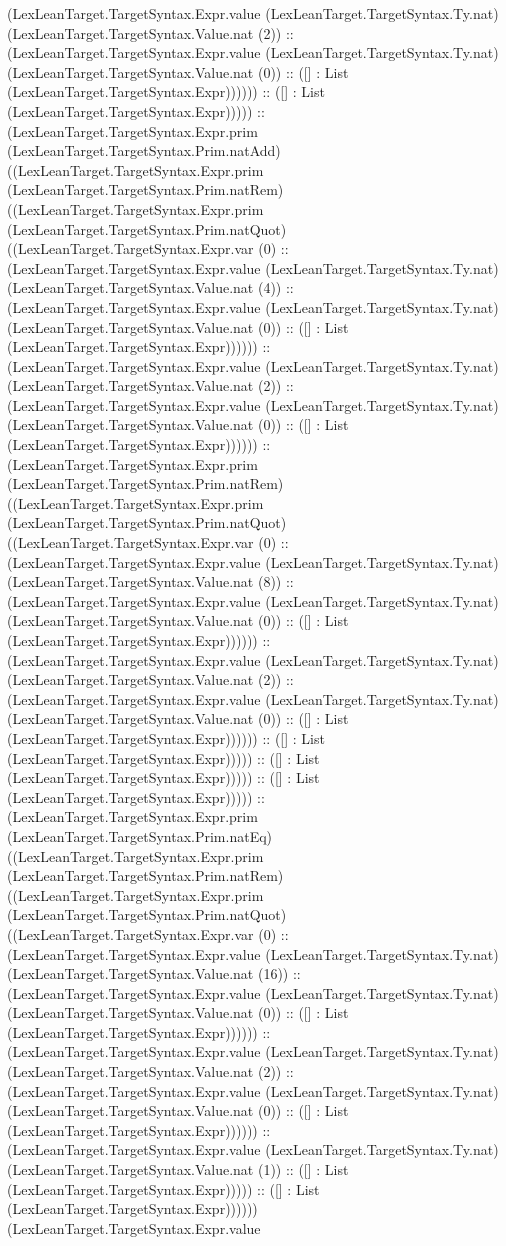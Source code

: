\documentclass[11pt]{article}
\begin{document}
(LexLeanTarget.TargetSyntax.Expr.value (LexLeanTarget.TargetSyntax.Ty.nat) (LexLeanTarget.TargetSyntax.Value.nat (2)) :: (LexLeanTarget.TargetSyntax.Expr.value (LexLeanTarget.TargetSyntax.Ty.nat) (LexLeanTarget.TargetSyntax.Value.nat (0)) :: ([] : List (LexLeanTarget.TargetSyntax.Expr)))))) :: ([] : List (LexLeanTarget.TargetSyntax.Expr))))) :: (LexLeanTarget.TargetSyntax.Expr.prim (LexLeanTarget.TargetSyntax.Prim.natAdd) ((LexLeanTarget.TargetSyntax.Expr.prim (LexLeanTarget.TargetSyntax.Prim.natRem) ((LexLeanTarget.TargetSyntax.Expr.prim (LexLeanTarget.TargetSyntax.Prim.natQuot) ((LexLeanTarget.TargetSyntax.Expr.var (0) :: (LexLeanTarget.TargetSyntax.Expr.value (LexLeanTarget.TargetSyntax.Ty.nat) (LexLeanTarget.TargetSyntax.Value.nat (4)) :: (LexLeanTarget.TargetSyntax.Expr.value (LexLeanTarget.TargetSyntax.Ty.nat) (LexLeanTarget.TargetSyntax.Value.nat (0)) :: ([] : List (LexLeanTarget.TargetSyntax.Expr)))))) :: (LexLeanTarget.TargetSyntax.Expr.value (LexLeanTarget.TargetSyntax.Ty.nat) (LexLeanTarget.TargetSyntax.Value.nat (2)) :: (LexLeanTarget.TargetSyntax.Expr.value (LexLeanTarget.TargetSyntax.Ty.nat) (LexLeanTarget.TargetSyntax.Value.nat (0)) :: ([] : List (LexLeanTarget.TargetSyntax.Expr)))))) :: (LexLeanTarget.TargetSyntax.Expr.prim (LexLeanTarget.TargetSyntax.Prim.natRem) ((LexLeanTarget.TargetSyntax.Expr.prim (LexLeanTarget.TargetSyntax.Prim.natQuot) ((LexLeanTarget.TargetSyntax.Expr.var (0) :: (LexLeanTarget.TargetSyntax.Expr.value (LexLeanTarget.TargetSyntax.Ty.nat) (LexLeanTarget.TargetSyntax.Value.nat (8)) :: (LexLeanTarget.TargetSyntax.Expr.value (LexLeanTarget.TargetSyntax.Ty.nat) (LexLeanTarget.TargetSyntax.Value.nat (0)) :: ([] : List (LexLeanTarget.TargetSyntax.Expr)))))) :: (LexLeanTarget.TargetSyntax.Expr.value (LexLeanTarget.TargetSyntax.Ty.nat) (LexLeanTarget.TargetSyntax.Value.nat (2)) :: (LexLeanTarget.TargetSyntax.Expr.value (LexLeanTarget.TargetSyntax.Ty.nat) (LexLeanTarget.TargetSyntax.Value.nat (0)) :: ([] : List (LexLeanTarget.TargetSyntax.Expr)))))) :: ([] : List (LexLeanTarget.TargetSyntax.Expr))))) :: ([] : List (LexLeanTarget.TargetSyntax.Expr))))) :: ([] : List (LexLeanTarget.TargetSyntax.Expr))))) :: (LexLeanTarget.TargetSyntax.Expr.prim (LexLeanTarget.TargetSyntax.Prim.natEq) ((LexLeanTarget.TargetSyntax.Expr.prim (LexLeanTarget.TargetSyntax.Prim.natRem) ((LexLeanTarget.TargetSyntax.Expr.prim (LexLeanTarget.TargetSyntax.Prim.natQuot) ((LexLeanTarget.TargetSyntax.Expr.var (0) :: (LexLeanTarget.TargetSyntax.Expr.value (LexLeanTarget.TargetSyntax.Ty.nat) (LexLeanTarget.TargetSyntax.Value.nat (16)) :: (LexLeanTarget.TargetSyntax.Expr.value (LexLeanTarget.TargetSyntax.Ty.nat) (LexLeanTarget.TargetSyntax.Value.nat (0)) :: ([] : List (LexLeanTarget.TargetSyntax.Expr)))))) :: (LexLeanTarget.TargetSyntax.Expr.value (LexLeanTarget.TargetSyntax.Ty.nat) (LexLeanTarget.TargetSyntax.Value.nat (2)) :: (LexLeanTarget.TargetSyntax.Expr.value (LexLeanTarget.TargetSyntax.Ty.nat) (LexLeanTarget.TargetSyntax.Value.nat (0)) :: ([] : List (LexLeanTarget.TargetSyntax.Expr)))))) :: (LexLeanTarget.TargetSyntax.Expr.value (LexLeanTarget.TargetSyntax.Ty.nat) (LexLeanTarget.TargetSyntax.Value.nat (1)) :: ([] : List (LexLeanTarget.TargetSyntax.Expr))))) :: ([] : List (LexLeanTarget.TargetSyntax.Expr)))))) (LexLeanTarget.TargetSyntax.Expr.value 
\end{document}

